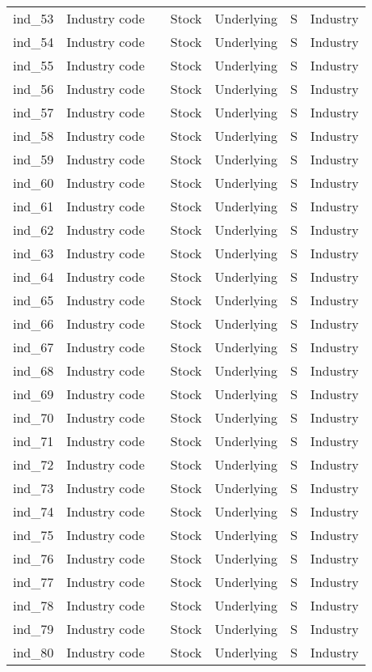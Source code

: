 \begin{longtable}{@{}llp{4cm}llll@{}}
ind\_53&Industry code&&Stock&Underlying&S&Industry\\%
ind\_54&Industry code&&Stock&Underlying&S&Industry\\%
ind\_55&Industry code&&Stock&Underlying&S&Industry\\%
ind\_56&Industry code&&Stock&Underlying&S&Industry\\%
ind\_57&Industry code&&Stock&Underlying&S&Industry\\%
ind\_58&Industry code&&Stock&Underlying&S&Industry\\%
ind\_59&Industry code&&Stock&Underlying&S&Industry\\%
ind\_60&Industry code&&Stock&Underlying&S&Industry\\%
ind\_61&Industry code&&Stock&Underlying&S&Industry\\%
ind\_62&Industry code&&Stock&Underlying&S&Industry\\%
ind\_63&Industry code&&Stock&Underlying&S&Industry\\%
ind\_64&Industry code&&Stock&Underlying&S&Industry\\%
ind\_65&Industry code&&Stock&Underlying&S&Industry\\%
ind\_66&Industry code&&Stock&Underlying&S&Industry\\%
ind\_67&Industry code&&Stock&Underlying&S&Industry\\%
ind\_68&Industry code&&Stock&Underlying&S&Industry\\%
ind\_69&Industry code&&Stock&Underlying&S&Industry\\%
ind\_70&Industry code&&Stock&Underlying&S&Industry\\%
ind\_71&Industry code&&Stock&Underlying&S&Industry\\%
ind\_72&Industry code&&Stock&Underlying&S&Industry\\%
ind\_73&Industry code&&Stock&Underlying&S&Industry\\%
ind\_74&Industry code&&Stock&Underlying&S&Industry\\%
ind\_75&Industry code&&Stock&Underlying&S&Industry\\%
ind\_76&Industry code&&Stock&Underlying&S&Industry\\%
ind\_77&Industry code&&Stock&Underlying&S&Industry\\%
ind\_78&Industry code&&Stock&Underlying&S&Industry\\%
ind\_79&Industry code&&Stock&Underlying&S&Industry\\%
ind\_80&Industry code&&Stock&Underlying&S&Industry\\%

\end{longtable}
